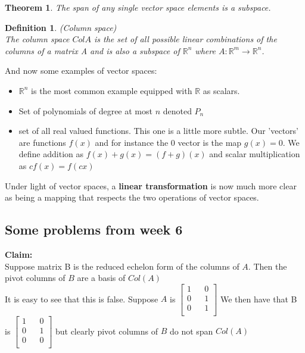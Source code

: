\documentclass[titlepage]{article}
\newtheorem{thm}{Theorem}[subsection]
\newtheorem{definition}{Definition}[subsection]
\numberwithin{equation}{subsection}
\begin{document}
\begin{thm}
The span of any single vector space elements is a subspace. 
\end{thm}

\begin{definition}(Column space)
\\
The column space $Col A$ is the set of all possible linear combinations of the columns of a matrix A and is also a subspace of $\mathbb{R}^{n}$ where $A:\mathbb{R}^{m} \to \mathbb{R}^{n}$.
\end{definition}


And now some examples of vector spaces:

\begin{example}
\begin{itemize}
    \item $\mathbb{R}^{n}$ is the most common example equipped with $\mathbb{R}$ as scalars.
    \item Set of polynomials of degree at most $n$ denoted $P_{n}$
    \item set of all real valued functions. This one is a little more subtle. Our 'vectors' are functions $f(x)$ and for instance the 0 vector is the map $g(x) = 0$. We define addition as $f(x) + g(x) = (f+g)(x)$ and scalar multiplication as $cf(x) = f(cx)$
\end{itemize}
\end{example}

Under light of vector spaces, a \textbf{linear transformation} is now much more clear as being a mapping that respects the two operations of vector spaces. 
\\

\subsection{Some problems from week 6}
\textbf{Claim:}
\\
Suppose matrix B is the reduced echelon form of the columns of $A$. Then the pivot columns of $B$ are a basis of $Col(A)$
\\

It is easy to see that this is false. Suppose $A$ is $\begin{bmatrix}
    1 && 0\\
    0 && 1\\
    0 && 1\\
\end{bmatrix}$ We then have that B is $\begin{bmatrix}
    1 && 0\\
    0 && 1\\
    0 && 0\\
\end{bmatrix}$ but clearly pivot columns of $B$ do not span $Col(A)$ 
\end{document}

